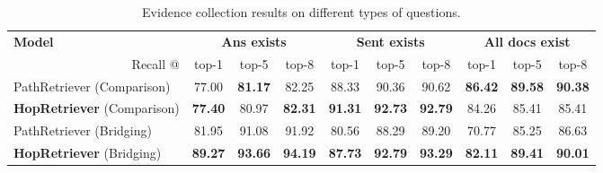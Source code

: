 \documentclass[letterpaper]{article} \usepackage{aaai21}  \usepackage{times}  \usepackage{helvet} \usepackage{courier}  \usepackage[hyphens]{url}  \usepackage{graphicx} \urlstyle{rm} \def\UrlFont{\rm}  \usepackage{graphicx}  \usepackage{natbib}  \usepackage{caption} \frenchspacing  \setlength{\pdfpagewidth}{8.5in}  \setlength{\pdfpageheight}{11in}
\newif\ifarivx
\begin{document}
\ifarivx
To achieve better performance, we introduce a neural ranker based on BERT-base \cite{BERT4ReRank} to produce more precise top-500 documents in the preliminary retrieval. And use ELECTRA \cite{ELECTRA} to take the place of BERT, i.e., use the ELECTRA base in HopRetriever for document sequence retrieval and use ELECTRA large for answer extraction. The results of this enhanced pipeline are denoted as HopRetriever-plus.
\fi

\begin{table*}[htbp]
    \footnotesize
    \centering
    \begin{tabular}{l|ccc|ccc|ccc}
        \hline
        \multicolumn{1}{l|}{\textbf{Model}}                        &\multicolumn{3}{c|}{\textbf{Ans exists}}     & \multicolumn{3}{c|}{\textbf{Sent exists}}   & \multicolumn{3}{c}{\textbf{All docs exist}}\\ 
        \multicolumn{1}{r|}{Recall @}                              & top-1         & top-5         & top-8         & top-1         & top-5        & top-8         & top-1        & top-5         & top-8         \\ \hline 
        PathRetriever (Comparison)                                 &77.00          &\textbf{81.17} &82.25          &88.33          &90.36         &90.62          &\textbf{86.42}&\textbf{89.58} &\textbf{90.38} \\
        \textbf{HopRetriever} (Comparison)                         &\textbf{77.40} &80.97          &\textbf{82.31} &\textbf{91.31} &\textbf{92.73}&\textbf{92.79} &84.26         &85.41          &85.41          \\ \hline
        PathRetriever (Bridging)                                   &81.95          &91.08          &91.92          &80.56          &88.29         &89.20          &70.77         &85.25          &86.63          \\ 
        \textbf{HopRetriever} (Bridging)                           &\textbf{89.27} &\textbf{93.66} &\textbf{94.19} &\textbf{87.73}&\textbf{92.79}&\textbf{93.29} &\textbf{82.11}&\textbf{89.41} &\textbf{90.01} \\
        \hline
    \end{tabular}
    \caption{Evidence collection results on different types of questions.}
    \label{tab:doc_res_qt}
\end{table*}
\end{document}
